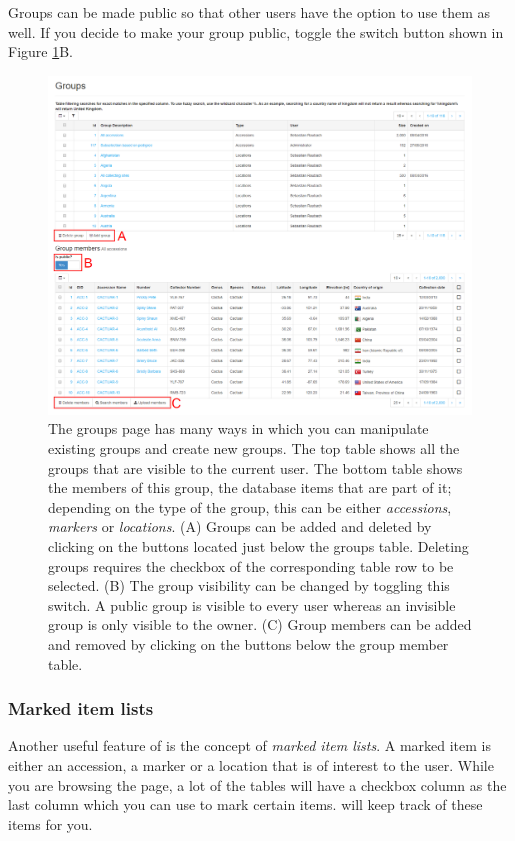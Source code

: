 Groups can be made public so that other users have the option to use them as well. If you decide to make your group public, toggle the switch button shown in Figure \ref{fig:features:groups-page}B.

\begin{figure}
	\centering
	\includegraphics[width=0.85\linewidth]{img/features/groups-page.png}
	\caption{The groups page has many ways in which you can manipulate existing groups and create new groups. The top table shows all the groups that are visible to the current user. The bottom table shows the members of this group, \ie the database items that are part of it; depending on the type of the group, this can be either \textit{accessions}, \textit{markers} or \textit{locations}. (A) Groups can be added and deleted by clicking on the buttons located just below the groups table. Deleting groups requires the checkbox of the corresponding table row to be selected. (B) The group visibility can be changed by toggling this switch. A public group is visible to every user whereas an invisible group is only visible to the owner. (C) Group members can be added and removed by clicking on the buttons below the group member table.}
	\label{fig:features:groups-page}
\end{figure}

\subsubsection{Marked item lists}
\label{sec:features:marked-items}

Another useful feature of {\germinate} is the concept of \textit{marked item lists}. A marked item is either an accession, a marker or a location that is of interest to the user. While you are browsing the page, a lot of the tables will have a checkbox column as the last column which you can use to mark certain items. {\germinate} will keep track of these items for you.

